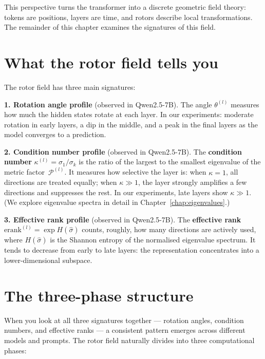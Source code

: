 \documentclass[11pt, twoside, openright]{memoir}
\newcommand{\metric}[1]{\mathcal{P}^{(#1)}} %
\numberwithin{equation}{chapter}
\begin{document}
This perspective turns the transformer into a discrete geometric field
theory: tokens are positions, layers are time, and rotors describe local
transformations.  The remainder of this chapter examines the signatures
of this field.

\section{What the rotor field tells you}

The rotor field has three main signatures:

\begin{finding}
\textbf{1. Rotation angle profile} (observed in Qwen2.5-7B).
The angle $\theta^{(l)}$ measures how much the hidden states rotate at
each layer.  In our experiments: moderate rotation in early layers, a
dip in the middle, and a peak in the final layers as the model
converges to a prediction.
\end{finding}

\begin{finding}
\textbf{2. Condition number profile} (observed in Qwen2.5-7B).
The \textbf{condition number} $\kappa^{(l)} = \sigma_1/\sigma_k$ is
the ratio of the largest to the smallest eigenvalue of the metric
factor~$\metric{l}$.  It measures how selective the layer is: when
$\kappa = 1$, all directions are treated equally; when $\kappa \gg 1$,
the layer strongly amplifies a few directions and suppresses the rest.
In our experiments, late layers show $\kappa \gg 1$.  (We explore
eigenvalue spectra in detail in Chapter~\ref{chap:eigenvalues}.)
\end{finding}

\begin{finding}
\textbf{3. Effective rank profile} (observed in Qwen2.5-7B).
The \textbf{effective rank} $\mathrm{erank}^{(l)} = \exp H(\hat\sigma)$
counts, roughly, how many directions are actively used, where
$H(\hat\sigma)$ is the Shannon entropy of the normalised eigenvalue
spectrum.  It tends to decrease from early to late layers: the
representation concentrates into a lower-dimensional subspace.
\end{finding}

\section{The three-phase structure}
\label{sec:three-phase}

When you look at all three signatures together --- rotation angles,
condition numbers, and effective ranks --- a consistent pattern emerges
across different models and prompts.  The rotor field naturally divides
into three computational phases:
\end{document}
